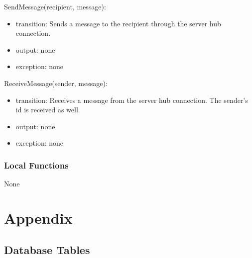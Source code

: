 \documentclass[12pt, titlepage]{article}
\begin{document}
\begin{itemize}
\noindent SendMessage(recipient, message):
\begin{itemize}
\item transition: Sends a message to the recipient through the server hub connection.
\item output: none
\item exception: none
\end{itemize}

\noindent ReceiveMessage(sender, message):
\begin{itemize}
\item transition: Receives a message from the server hub connection. The sender's id is received as well.
\item output: none
\item exception: none
\end{itemize}

\subsubsection{Local Functions}

None

\newpage

\section{Appendix} \label{Appendix}
\subsection{Database Tables}


\end{itemize}
\end{document}
